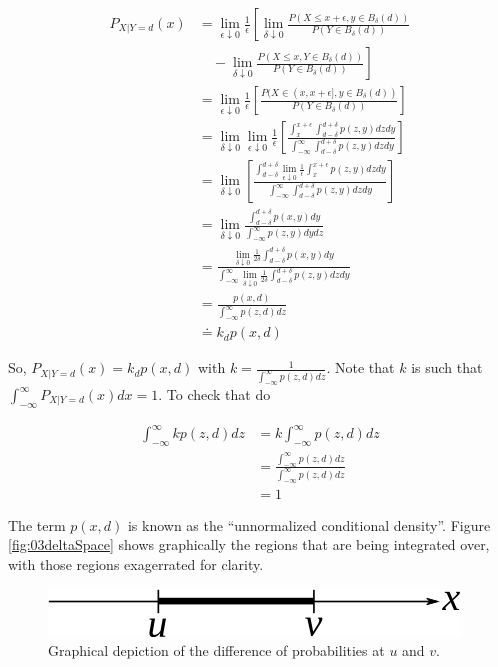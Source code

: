 \begin{align*}
P_{X|Y=d}(x) &= \lim_{\epsilon\downarrow 0}\frac{1}{\epsilon}\left[\lim_{\delta\downarrow 0} \frac{P(X\leq x+\epsilon, y\in B_\delta(d))}{P(Y\in B_\delta(d))} \right. \\
&\left.\quad - \lim_{\delta\downarrow 0} \frac{P(X\leq x, Y\in B_\delta(d))}{P(Y\in B_\delta(d))}\right] \\
&= \lim_{\epsilon\downarrow 0}\frac{1}{\epsilon}\left[ \frac{P(X\in(x,x+\epsilon],y\in B_\delta(d))}{P(Y\in B_\delta(d))}\right] \\
&= \lim_{\delta\downarrow 0}\lim_{\epsilon\downarrow 0}\frac{1}{\epsilon} \left[ \frac{\int_x^{x+\epsilon} \int_{d-\delta}^{d+\delta} p(z,y)dzdy}{\int_{-\infty}^\infty \int_{d-\delta}^{d+\delta} p(z,y)dzdy}\right] \\
&= \lim_{\delta\downarrow 0}\left[ \frac{\int_{d-\delta}^{d+\delta}\lim_{\epsilon\downarrow 0} \frac{1}{\epsilon} \int_x^{x+\epsilon} p(z,y)dzdy}{\int_{-\infty}^\infty \int_{d-\delta}^{d+\delta} p(z,y)dzdy}\right] \\
&= \lim_{\delta\downarrow 0} \frac{\int_{d-\delta}^{d+\delta}p(x,y)dy}{\int_{-\infty}^\infty p(z,y)dydz} \\
&= \frac{\lim_{\delta\downarrow 0}\frac{1}{2\delta}\int_{d-\delta}^{d+\delta} p(x,y)dy}{\int_{-\infty}^\infty \lim_{\delta\downarrow 0}\frac{1}{2\delta}\int_{d-\delta}^{d+\delta} p(z,y)dzdy} \\
&= \frac{p(x,d)}{\int_{-\infty}^\infty p(z,d)dz} \\
&\doteq k_dp(x,d)
\end{align*}

So, $P_{X|Y=d}(x) = k_dp(x,d)$ with $k=\frac{1}{\int_{-\infty}^\infty p(z,d)dz}$. Note that $k$ is such that $\int_{-\infty}^\infty P_{X|Y=d}(x)dx=1$. To check that do

\begin{align*}
\int_{-\infty}^\infty kp(z,d)dz &= k\int_{-\infty}^\infty p(z,d)dz \\
&= \frac{\int_{-\infty}^\infty p(z,d)dz}{\int_{-\infty}^\infty p(z,d)dz} \\
&= 1
\end{align*}

The term $p(x,d)$ is known as the ``unnormalized conditional density''. Figure \ref{fig:03deltaSpace} shows graphically the regions that are being integrated over, with those regions exagerrated for clarity.

\begin{figure}[ht!]
	\centering
	\includegraphics[width=.5\textwidth]{images/03probR1}
	\caption{Graphical depiction of the difference of probabilities at $u$ and $v$.}
	\label{fig:03probR1}
\end{figure}

